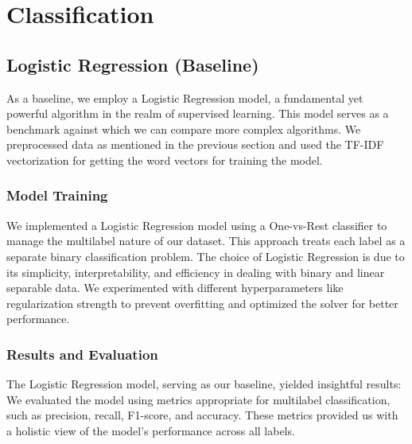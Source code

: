 \section{Classification}

\subsection{Logistic Regression (Baseline)}

As a baseline, we employ a Logistic Regression model, a fundamental yet powerful algorithm in the realm of supervised learning. This model serves as a benchmark against which we can compare more complex algorithms. We preprocessed data as mentioned in the previous section and used the TF-IDF vectorization for getting the word vectors for training the model.


\subsubsection{Model Training}

We implemented a Logistic Regression model using a One-vs-Rest classifier to manage the multilabel nature of our dataset. This approach treats each label as a separate binary classification problem. The choice of Logistic Regression is due to its simplicity, interpretability, and efficiency in dealing with binary and linear separable data. We experimented with different hyperparameters like regularization strength to prevent overfitting and optimized the solver for better performance.

\subsubsection{Results and Evaluation}

The Logistic Regression model, serving as our baseline, yielded insightful results: We evaluated the model using metrics appropriate for multilabel classification, such as precision, recall, F1-score, and accuracy. These metrics provided us with a holistic view of the model's performance across all labels.

